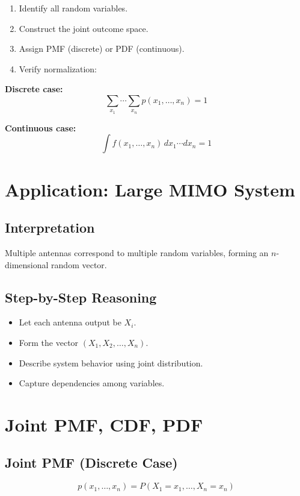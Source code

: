 \documentclass[12pt]{article}
\begin{document}
\begin{enumerate}
\item Identify all random variables.
\item Construct the joint outcome space.
\item Assign PMF (discrete) or PDF (continuous).
\item Verify normalization:
\end{enumerate}

\textbf{Discrete case:}
\[
\sum_{x_1} \cdots \sum_{x_n} p(x_1,\dots,x_n) = 1
\]

\textbf{Continuous case:}
\[
\int f(x_1,\dots,x_n)\, dx_1 \cdots dx_n = 1
\]

\section{Application: Large MIMO System}

\subsection{Interpretation}

Multiple antennas correspond to multiple random variables, forming an $n$-dimensional random vector.

\subsection{Step-by-Step Reasoning}

\begin{itemize}
\item Let each antenna output be $X_i$.
\item Form the vector $(X_1, X_2, \dots, X_n)$.
\item Describe system behavior using joint distribution.
\item Capture dependencies among variables.
\end{itemize}

\section{Joint PMF, CDF, PDF}

\subsection{Joint PMF (Discrete Case)}

\[
p(x_1,\dots,x_n) =
P(X_1 = x_1, \dots, X_n = x_n)
\]
\end{document}
